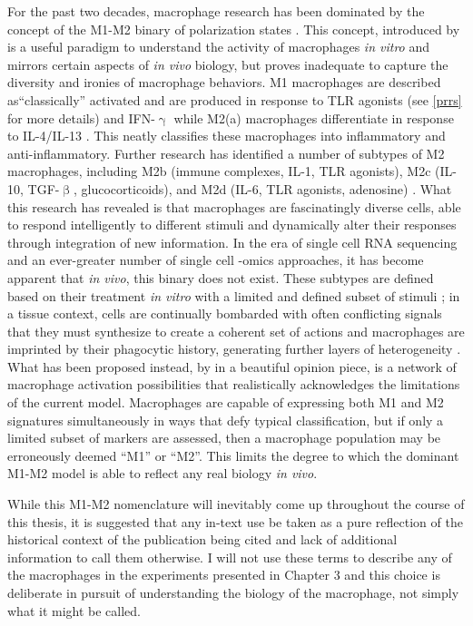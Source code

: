 For the past two decades, macrophage research has been dominated by the concept of the M1\hyp{}M2 binary of polarization states \citep{Italiani2014, Mills2015}. This concept, introduced by \citet{Mills2000} is a useful paradigm to understand the activity of macrophages \textit{in vitro} and mirrors certain aspects of \textit{in vivo} biology, but proves inadequate to capture the diversity and ironies of macrophage behaviors. M1 macrophages are described as``classically'' activated and are produced in response to TLR agonists (see \autoref{prrs} for more details) and IFN\hyp{}$\upgamma$  while M2(a) macrophages differentiate in response to IL\hyp{}4/IL\hyp{}13 \citep{Mills2014, Wynn2013}. This neatly classifies these macrophages into inflammatory and anti\hyp{}inflammatory. Further research has identified a number of subtypes of M2 macrophages, including M2b (immune complexes, IL\hyp{}1, TLR agonists), M2c (IL\hyp{}10, TGF\hyp{}$\upbeta$, glucocorticoids), and M2d (IL\hyp{}6, TLR agonists, adenosine) \citep{Huang2018}. What this research has revealed is that macrophages are fascinatingly diverse cells, able to respond intelligently to different stimuli and dynamically alter their responses through integration of new information. In the era of single cell RNA sequencing and an ever\hyp{}greater number of single cell \hyp{}omics approaches, it has become apparent that \textit{in vivo}, this binary does not exist. These subtypes are defined based on their treatment \textit{in vitro} with a limited and defined subset of stimuli \citep{Gosselin2014, Wynn2013}; in a tissue context, cells are continually bombarded with often conflicting signals that they must synthesize to create a coherent set of actions \citep{Murray2014} and macrophages are imprinted by their phagocytic history, generating further layers of heterogeneity \citep{Gonzalez2017}. What has been proposed instead, by \citet{Nahrendorf2016} in a beautiful opinion piece, is a network of macrophage activation possibilities that realistically acknowledges the limitations of the current model. Macrophages are capable of expressing both M1 and M2 signatures simultaneously in ways that defy typical classification, but if only a limited subset of markers are assessed, then a macrophage population may be erroneously deemed ``M1'' or ``M2''. This limits the degree to which the dominant M1\hyp{}M2 model is able to reflect any real biology \textit{in vivo}. 

While this M1\hyp{}M2 nomenclature will inevitably come up throughout the course of this thesis, it is suggested that any in\hyp{}text use be taken as a pure reflection of the historical context of the publication being cited and lack of additional information to call them otherwise. I will not use these terms to describe any of the macrophages in the experiments presented in Chapter 3 and this choice is deliberate in pursuit of understanding the biology of the macrophage, not simply what it might be called.

